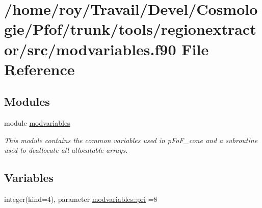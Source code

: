 \hypertarget{tools_2regionextractor_2src_2modvariables_8f90}{}\section{/home/roy/\+Travail/\+Devel/\+Cosmologie/\+Pfof/trunk/tools/regionextractor/src/modvariables.f90 File Reference}
\label{tools_2regionextractor_2src_2modvariables_8f90}
\subsection*{Modules}
\begin{DoxyCompactItemize}
\item 
module \hyperlink{namespacemodvariables}{modvariables}
\begin{DoxyCompactList}\small\item\em This module contains the common variables used in p\+Fo\+F\+\_\+cone and a subroutine used to deallocate all allocatable arrays. \end{DoxyCompactList}\end{DoxyCompactItemize}
\subsection*{Variables}
\begin{DoxyCompactItemize}
\item 
integer(kind=4), parameter \hyperlink{namespacemodvariables_a51e0b900e05f4302a36ddf33b6df0649}{modvariables\+::pri} =8
\end{DoxyCompactItemize}
